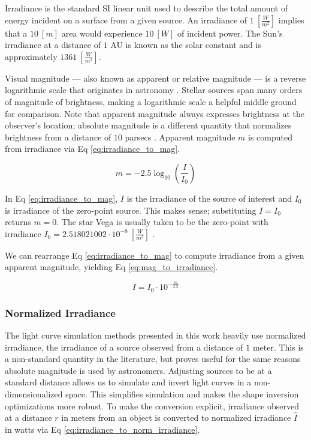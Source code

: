 Irradiance is the standard SI linear unit used to describe the total amount of energy incident on a
surface from a given source. An irradiance of $1 \: \left[ \frac{W}{m^2} \right]$ implies that a $10
\: [m]$ area would experience $10 \: [W]$ of incident power. The Sun's irradiance at a distance of $1$ AU is known as the solar constant and is approximately $1361 \: \left[ \frac{W}{m^2} \right]$. 

Visual magnitude ---  also known as apparent or relative magnitude --- is a reverse logarithmic scale
that originates in astronomy \cite{frueh2019notes}. Stellar sources span many orders of magnitude of brightness, making a
logarithmic scale a helpful middle ground for comparison. Note that apparent magnitude always
expresses brightness at the observer's location; absolute magnitude is a different quantity that
normalizes brightness from a distance of $10$ parsecs \cite{frueh2019notes}. Apparent magnitude $m$
is computed from irradiance via Eq \ref{eq:irradiance_to_mag}.

\begin{equation} \label{eq:irradiance_to_mag}
  m = -2.5 \log_{10}\left( \frac{I}{I_0} \right)
\end{equation}

In Eq \ref{eq:irradiance_to_mag}, $I$ is the irradiance of the source of interest and $I_0$ is
irradiance of the zero-point source. This makes sense; substituting $I = I_0$ returns
$m=0$. The star Vega is usually taken to be the zero-point with irradiance $I_0 = 2.518021002\cdot
10^{-8} \: \left[ \frac{W}{m^2} \right]$ \cite{frueh2019notes}.

We can rearrange Eq \ref{eq:irradiance_to_mag} to compute irradiance from a given apparent magnitude,
yielding Eq \ref{eq:mag_to_irradiance}.

\begin{equation} \label{eq:mag_to_irradiance}
  I = I_0 \cdot 10^{-\frac{m}{2.5}}
\end{equation}

\subsubsection{Normalized Irradiance}

The light curve simulation methods presented in this work heavily use normalized irradiance, 
the irradiance of a source observed from a distance of $1$ meter. This is a non-standard quantity in the literature, but proves useful for the same reasons
absolute magnitude is used by astronomers. Adjusting sources to be at a standard distance allows us
to simulate and invert light curves in a non-dimensionalized space. This simplifies simulation and
makes the shape inversion optimizations more robust. To make the conversion explicit, irradiance observed
at a distance $r$ in meters from an object is converted to normalized irradiance $\hat{I}$ in watts via Eq
\ref{eq:irradiance_to_norm_irradiance}.

